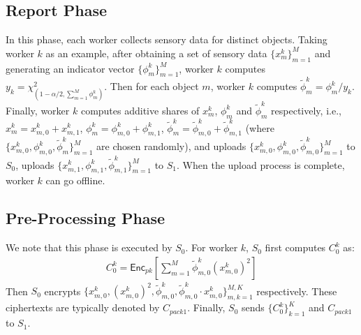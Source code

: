 \documentclass[conference]{IEEEtran}
\begin{document}
\subsection{Report Phase}
In this phase, each worker collects sensory data for distinct objects.
Taking worker $k$ as an example, after obtaining a set of sensory data $\{x_m^k\}_{m=1}^M$ and generating an indicator vector $\{\phi_m^k\}_{m=1}^M$, worker $k$ computes $y_k = \chi^2_{(1-\alpha/2, \sum_{m=1}^M \phi_m^k)}$.
Then for each object $m$, worker $k$ computes $\tilde{\phi}_m^k = \phi_m^k / y_k$.
Finally, worker $k$ computes additive shares of $x_m^k$, $\phi_m^k$ and $\tilde{\phi}_m^k$ respectively, i.e., $x_m^k = x_{m,0}^k + x_{m,1}^k$, $\phi_m^k = \phi_{m,0}^k + \phi_{m,1}^k$, $\tilde{\phi}_m^k = \tilde{\phi}_{m,0}^k + \tilde{\phi}_{m,1}^k$ (where $\{x_{m,0}^k, \phi_{m,0}^k, \tilde{\phi}_m^k\}_{m=1}^M$ are chosen randomly), and uploads $\{x_{m,0}^k, \phi_{m,0}^k ,\tilde{\phi}_{m,0}^k\}_{m=1}^M$ to $S_0$, uploads $\{x_{m,1}^k, \phi_{m,1}^k, \tilde{\phi}_{m,1}^k\}_{m=1}^M$ to $S_1$.
When the upload process is complete, worker $k$ can go offline.

\subsection{Pre-Processing Phase}
We note that this phase is executed by $S_0$.
For worker $k$, $S_0$ first computes $C_0^k$ as: 
\begin{equation}
  \begin{split}
  C_0^k = \mathsf{Enc}_{pk}\left[\sum_{m=1}^M \tilde{\phi}_{m,0}^k \left(x_{m,0}^k\right)^2\right]
  \end{split}
\end{equation}
Then $S_0$ encrypts $\{x_{m,0}^k, (x_{m,0}^k)^2, \tilde{\phi}_{m,0}^k,\tilde{\phi}_{m,0}^k\cdot x_{m,0}^k\}_{m,k=1}^{M,K}$ respectively.
These ciphertexts are typically denoted by $C_{pack1}$.
Finally, $S_0$ sends $\{C_0^k\}_{k=1}^K$ and $C_{pack1}$ to $S_1$.
\end{document}
